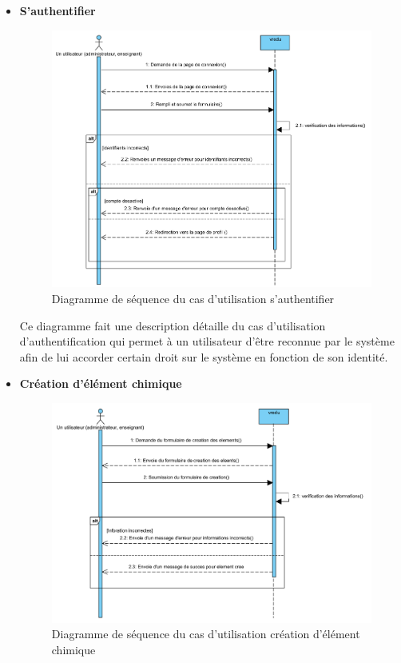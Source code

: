 \begin{itemize}
	\item \textbf{S’authentifier}

	      \begin{figure}[H]
		      \centering
		      \includegraphics[width=1\textwidth]{img/ucdAuth}
		      \caption{Diagramme de séquence du cas d'utilisation s’authentifier}
		      \label{fig:mesh1}
	      \end{figure}

	      Ce diagramme fait une description détaille du cas d’utilisation d’authentification qui permet à un utilisateur d’être reconnue par le système afin de lui accorder certain droit sur le système en fonction de son identité.

	\newpage
	\item \textbf{Création d’élément chimique}

	      \begin{figure}[H]
		      \centering
		      \includegraphics[width=1\textwidth]{img/ucdElCr}
		      \caption{Diagramme de séquence du cas d'utilisation création d’élément chimique}
		      \label{fig:mesh1}
	      \end{figure}


\end{itemize}
